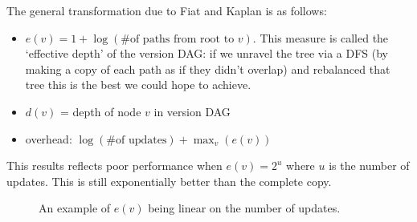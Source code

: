 \documentclass[11pt]{article}
\begin{document}
The general transformation due to Fiat and Kaplan \cite{fiat} is as follows:

\begin{itemize}
\item \(e(v) = 1 + \log(\mbox{\# of paths from root to $v$})\). This measure is called the `effective depth' of the version DAG: if we unravel the tree via a DFS (by making a copy of each path as if they didn't overlap) and rebalanced that tree this is the best we could hope to achieve. 
\item $d(v)$ = depth of node $v$ in version DAG
\item overhead: \( \log(\mbox{\# of updates}) + \max_v(e(v))\)
\end{itemize}

This results reflects poor performance when $e(v) = 2^{u}$ where $u$ is the number of updates. This is still exponentially better than the complete copy.

\begin{figure}[h]
  \begin{center}
  \end{center}
  \caption{\small An example of $e(v)$ being linear on the number of updates.}
  \label{exponential-paths}
\end{figure}
\end{document}
